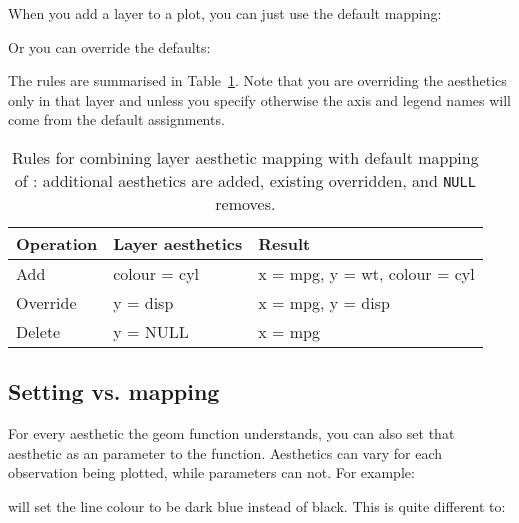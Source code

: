 When you add a layer to a plot, you can just use the default mapping: 

% 


Or you can override the defaults:

% 


\noindent The rules are summarised in Table~\ref{tbl:aes-override}.  Note that you are overriding the aesthetics only in that layer and unless you specify otherwise the axis and legend names will come from the default assignments. 

\begin{table}
  \begin{center}
  \begin{tabular}{lll}
    \toprule
    Operation & Layer aesthetics  & Result \\
    \midrule
    Add       & colour = cyl & x = mpg, y = wt, colour = cyl \\
    Override  & y = disp     & x = mpg, y = disp \\
    Delete    & y = NULL     & x = mpg \\
    \bottomrule
  \end{tabular}
  \end{center}
  \caption{Rules for combining layer aesthetic mapping with default mapping of :  additional aesthetics are added, existing overridden, and {\tt NULL} removes.}
  \label{tbl:aes-override}
\end{table}


\subsection{Setting vs. mapping}
\label{sub:setting-mapping}

For every aesthetic the geom function understands, you can also set that aesthetic as an parameter to the function.  Aesthetics can vary for each observation being plotted, while parameters can not.  For example:

% 


\noindent will set the line colour to be dark blue instead of black.  This is quite different to:

